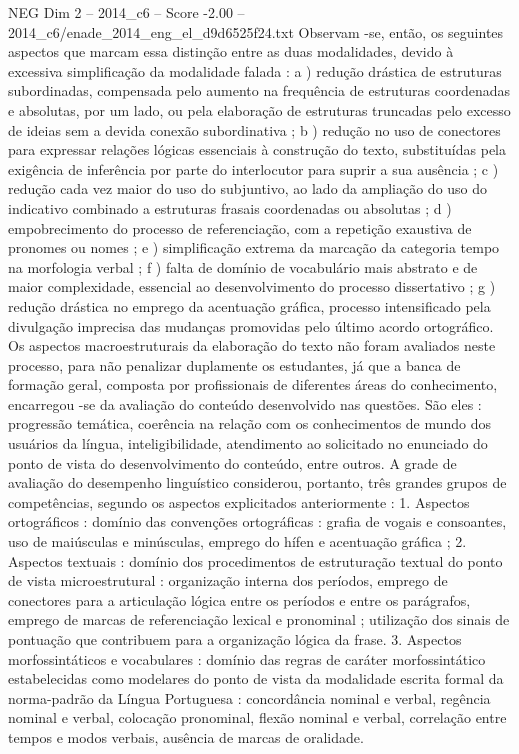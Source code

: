 \begin{textsample}{NEG Dim 2 – 2014\_c6 – Score -2.00 – 2014\_c6/enade\_2014\_eng\_el\_d9d6525f24.txt}
Observam -se, então, os seguintes aspectos que marcam essa distinção entre as duas modalidades, devido à excessiva simplificação da modalidade falada : a ) redução drástica de estruturas subordinadas, compensada pelo aumento na frequência de estruturas coordenadas e absolutas, por um lado, ou pela elaboração de estruturas truncadas pelo excesso de ideias sem a devida conexão subordinativa ; b ) redução no uso de conectores para expressar relações lógicas essenciais à construção do texto, substituídas pela exigência de inferência por parte do interlocutor para suprir a sua ausência ; c ) redução cada vez maior do uso do subjuntivo, ao lado da ampliação do uso do indicativo combinado a estruturas frasais coordenadas ou absolutas ; d ) empobrecimento do processo de referenciação, com a repetição exaustiva de pronomes ou nomes ; e ) simplificação extrema da marcação da categoria tempo na morfologia verbal ; f ) falta de domínio de vocabulário mais abstrato e de maior complexidade, essencial ao desenvolvimento do processo dissertativo ; g ) redução drástica no emprego da acentuação gráfica, processo intensificado pela divulgação imprecisa das mudanças promovidas pelo último acordo ortográfico.
Os aspectos macroestruturais da elaboração do texto não foram avaliados neste processo, para não penalizar duplamente os estudantes, já que a banca de formação geral, composta por profissionais de diferentes áreas do conhecimento, encarregou -se da avaliação do conteúdo desenvolvido nas questões.
São eles : progressão temática, coerência na relação com os conhecimentos de mundo dos usuários da língua, inteligibilidade, atendimento ao solicitado no enunciado do ponto de vista do desenvolvimento do conteúdo, entre outros.
A grade de avaliação do desempenho linguístico considerou, portanto, três grandes grupos de competências, segundo os aspectos explicitados anteriormente : 1.
Aspectos ortográficos : domínio das convenções ortográficas : grafia de vogais e consoantes, uso de maiúsculas e minúsculas, emprego do hífen e acentuação gráfica ; 2.
Aspectos textuais : domínio dos procedimentos de estruturação textual do ponto de vista microestrutural : organização interna dos períodos, emprego de conectores para a articulação lógica entre os períodos e entre os parágrafos, emprego de marcas de referenciação lexical e pronominal ; utilização dos sinais de pontuação que contribuem para a organização lógica da frase. 3.
Aspectos morfossintáticos e vocabulares : domínio das regras de caráter morfossintático estabelecidas como modelares do ponto de vista da modalidade escrita formal da norma-padrão da Língua Portuguesa : concordância nominal e verbal, regência nominal e verbal, colocação pronominal, flexão nominal e verbal, correlação entre tempos e modos verbais, ausência de marcas de oralidade.

\end{textsample}
